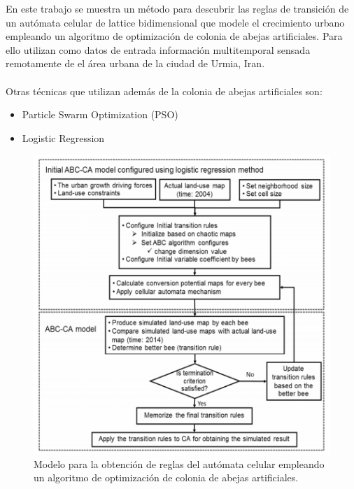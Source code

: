 En este trabajo \citep{naghibi2016discovery} se muestra un método para descubrir las reglas de transición de un autómata celular de lattice bidimensional que modele el crecimiento urbano empleando un algoritmo de optimización de colonia de abejas artificiales. Para ello utilizan como datos de entrada información multitemporal sensada remotamente de el área urbana de la ciudad de Urmia, Iran.
\\
\\
Otras técnicas que utilizan además de la colonia de abejas artificiales son:
\begin{itemize}
	\item Particle Swarm Optimization (PSO)
	\item Logistic Regression
\end{itemize}

\begin{figure}[h]
	\centering
	\includegraphics[width=\linewidth]{fig/abc}
	\caption{Modelo para la obtención de reglas del autómata celular empleando un algoritmo de optimización de colonia de abejas artificiales.}
	\label{fig:abc}
\end{figure}

